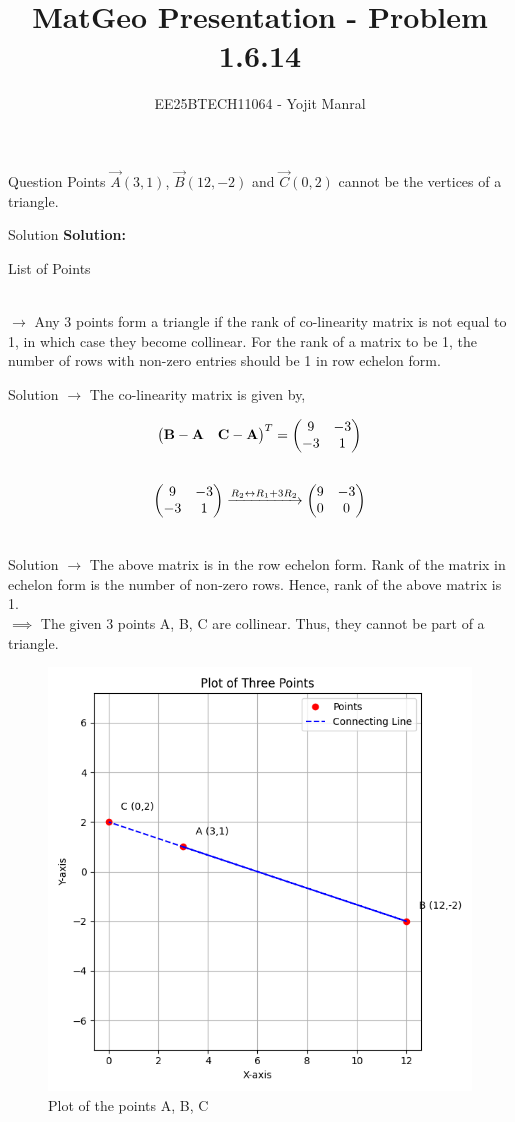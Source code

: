 \documentclass{beamer}
\title{MatGeo Presentation - Problem 1.6.14}
\author{EE25BTECH11064 - Yojit Manral}
\date{}
\numberwithin{equation}{section}
\providecommand{\brak}[1]{\ensuremath{\left(#1\right)}}
\theoremstyle{remark}
\newcommand{\myvec}[1]{\ensuremath{\begin{pmatrix}#1\end{pmatrix}}}
\let\vec\mathbf
\begin{document}
\frame{\titlepage}
\begin{frame}{Question}
Points $\Vec{A}$$\brak{3,1}$, $\Vec{B}$$\brak{12,-2}$ and $\Vec{C}$$\brak{0,2}$ cannot be the vertices of a triangle.
\end{frame}

\begin{frame}{Solution}
\textbf{Solution:}\\
\begin{table}[h!]    
  \centering
  
  \caption{List of Points}
  \label{Table_1}
\end{table}\\

$\rightarrow$ Any 3 points form a triangle if the rank of co-linearity matrix is not equal to 1, in which case they become collinear. For the rank of a matrix to be 1, the number of rows with non-zero entries should be 1 in row echelon form. \\

\end{frame}

\begin{frame}{Solution}
$\rightarrow$ The co-linearity matrix is given by,

\begin{align}
\myvec{\vec{B}-\vec{A} & \vec{C}-\vec{A}}^T = \myvec{9 & -3 \\ -3 & 1}\\
\notag
\end{align}
\begin{align}
\myvec{9 & -3 \\ -3 & 1}
&\xrightarrow{R_2 \leftrightarrow R_1 + 3R_2}
\myvec{9 & -3 \\ 0 & 0}\\
\notag
\end{align}
\end{frame}

\begin{frame}{Solution}
$\rightarrow$ The above matrix is in the row echelon form. Rank of the matrix in echelon form is the number of non-zero rows. Hence, rank of the above matrix is 1.\\
$\implies$ The given 3 points A, B, C are collinear. Thus, they cannot be part of a triangle.
\begin{figure}[h!]
   \centering
   \includegraphics[width=0.4\linewidth]{figs/01.png}
   \caption{Plot of the points A, B, C}
   \label{Plot_1}
\end{figure}
\end{frame}
\end{document}
